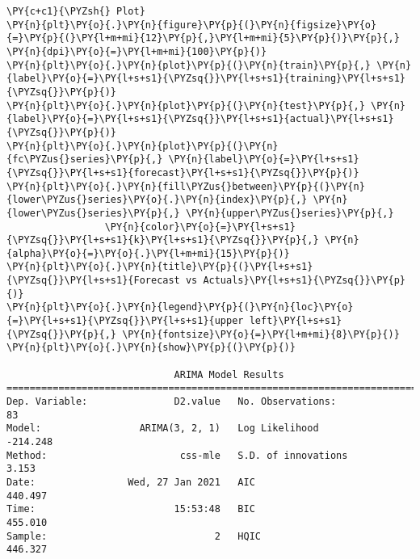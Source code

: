 \begin{codebox}[breakable, size=fbox, boxrule=1pt, pad at break*=1mm,colback=cellbackground, colframe=cellborder]
\begin{Verbatim}[commandchars=\\\{\}]
\PY{c+c1}{\PYZsh{} Plot}
\PY{n}{plt}\PY{o}{.}\PY{n}{figure}\PY{p}{(}\PY{n}{figsize}\PY{o}{=}\PY{p}{(}\PY{l+m+mi}{12}\PY{p}{,}\PY{l+m+mi}{5}\PY{p}{)}\PY{p}{,} \PY{n}{dpi}\PY{o}{=}\PY{l+m+mi}{100}\PY{p}{)}
\PY{n}{plt}\PY{o}{.}\PY{n}{plot}\PY{p}{(}\PY{n}{train}\PY{p}{,} \PY{n}{label}\PY{o}{=}\PY{l+s+s1}{\PYZsq{}}\PY{l+s+s1}{training}\PY{l+s+s1}{\PYZsq{}}\PY{p}{)}
\PY{n}{plt}\PY{o}{.}\PY{n}{plot}\PY{p}{(}\PY{n}{test}\PY{p}{,} \PY{n}{label}\PY{o}{=}\PY{l+s+s1}{\PYZsq{}}\PY{l+s+s1}{actual}\PY{l+s+s1}{\PYZsq{}}\PY{p}{)}
\PY{n}{plt}\PY{o}{.}\PY{n}{plot}\PY{p}{(}\PY{n}{fc\PYZus{}series}\PY{p}{,} \PY{n}{label}\PY{o}{=}\PY{l+s+s1}{\PYZsq{}}\PY{l+s+s1}{forecast}\PY{l+s+s1}{\PYZsq{}}\PY{p}{)}
\PY{n}{plt}\PY{o}{.}\PY{n}{fill\PYZus{}between}\PY{p}{(}\PY{n}{lower\PYZus{}series}\PY{o}{.}\PY{n}{index}\PY{p}{,} \PY{n}{lower\PYZus{}series}\PY{p}{,} \PY{n}{upper\PYZus{}series}\PY{p}{,} 
                 \PY{n}{color}\PY{o}{=}\PY{l+s+s1}{\PYZsq{}}\PY{l+s+s1}{k}\PY{l+s+s1}{\PYZsq{}}\PY{p}{,} \PY{n}{alpha}\PY{o}{=}\PY{o}{.}\PY{l+m+mi}{15}\PY{p}{)}
\PY{n}{plt}\PY{o}{.}\PY{n}{title}\PY{p}{(}\PY{l+s+s1}{\PYZsq{}}\PY{l+s+s1}{Forecast vs Actuals}\PY{l+s+s1}{\PYZsq{}}\PY{p}{)}
\PY{n}{plt}\PY{o}{.}\PY{n}{legend}\PY{p}{(}\PY{n}{loc}\PY{o}{=}\PY{l+s+s1}{\PYZsq{}}\PY{l+s+s1}{upper left}\PY{l+s+s1}{\PYZsq{}}\PY{p}{,} \PY{n}{fontsize}\PY{o}{=}\PY{l+m+mi}{8}\PY{p}{)}
\PY{n}{plt}\PY{o}{.}\PY{n}{show}\PY{p}{(}\PY{p}{)}

                             ARIMA Model Results
==============================================================================
Dep. Variable:               D2.value   No. Observations:                   83
Model:                 ARIMA(3, 2, 1)   Log Likelihood                -214.248
Method:                       css-mle   S.D. of innovations              3.153
Date:                Wed, 27 Jan 2021   AIC                            440.497
Time:                        15:53:48   BIC                            455.010
Sample:                             2   HQIC                           446.327


\end{Verbatim}
\end{codebox}
